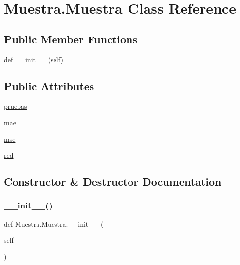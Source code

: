 \hypertarget{class_muestra_1_1_muestra}{}\section{Muestra.\+Muestra Class Reference}
\label{class_muestra_1_1_muestra}
\subsection*{Public Member Functions}
\begin{DoxyCompactItemize}
\item 
def \mbox{\hyperlink{class_muestra_1_1_muestra_a32851be663e08872a32e6a8ace2a3dbc}{\+\_\+\+\_\+init\+\_\+\+\_\+}} (self)
\end{DoxyCompactItemize}
\subsection*{Public Attributes}
\begin{DoxyCompactItemize}
\item 
\mbox{\hyperlink{class_muestra_1_1_muestra_a8332ed8ec72e86e0edbfa22bed6f3828}{pruebas}}
\item 
\mbox{\hyperlink{class_muestra_1_1_muestra_ab0f909db1b6d6ece313843239809a416}{mae}}
\item 
\mbox{\hyperlink{class_muestra_1_1_muestra_aef455f777517629e914cab0adfc2bf90}{mse}}
\item 
\mbox{\hyperlink{class_muestra_1_1_muestra_a128ddbba3c8cb8f8f98ad88d2b8d20fe}{red}}
\end{DoxyCompactItemize}


\subsection{Constructor \& Destructor Documentation}
\mbox{\label{class_muestra_1_1_muestra_a32851be663e08872a32e6a8ace2a3dbc}} 
\subsubsection{\texorpdfstring{\+\_\+\+\_\+init\+\_\+\+\_\+()}{\_\_init\_\_()}}
{\footnotesize\ttfamily def Muestra.\+Muestra.\+\_\+\+\_\+init\+\_\+\+\_\+ (\begin{DoxyParamCaption}\item[{}]{self }\end{DoxyParamCaption})}



